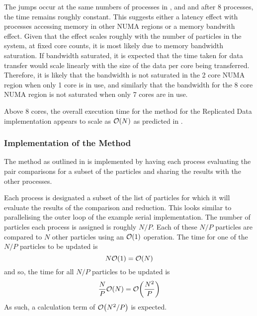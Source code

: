 The jumps occur at the same numbers of processes in
,
 and
and after 8 processes, the time remains roughly constant.
%
This suggests either a latency effect with processes accessing memory
in other NUMA regions or a memory bandwith effect.
%
Given that the effect scales roughly with the number of particles
in the system, at fixed core counts, it is most likely due to
memory bandwidth saturation.
%
If bandwidth saturated, it is expected that the time taken for
data transfer would
scale linearly with the size of the data per core being transferred.
%
Therefore, it is likely that the bandwidth is not saturated in the 2 core NUMA
region when only 1 core is in use, and
similarly that the bandwidth for the 8 core NUMA region is not saturated
when only 7 cores are in use.

Above 8 cores, the overall execution time for
the \individualoperation{} method for the Replicated Data implementation
appears to scale as $\mathcal{O}{\left({ N }\right)}$
as predicted in .


%
%

\subsubsection{Implementation of the \pairoperation{} Method}

The \pairoperation{} method as outlined in
is implemented by having each process evaluating the pair
comparisons for a subset of the particles and sharing the
results with the other processes.

Each process is designated a subset of the list of particles for which
it will evaluate the results of the comparison and reduction.
%
This looks similar to parallelising the outer loop of the example
serial implementation.
%
The number of particles each process is assigned is roughly $N/P$.
%
Each of these $N/P$ particles are compared to $N$ other particles
using an $\mathcal{O}{\left({ 1 }\right)}$ operation.
%
The time for one of the $N/P$ particles to be updated is
\begin{equation}
    N\mathcal{O}{\left({ 1 }\right)} = \mathcal{O}{\left({ N }\right)}
\end  {equation}
and so, the time for all $N/P$ particles to be updated is
\begin{equation}
    \frac{N}{P}\mathcal{O}{\left({ N }\right)} = \mathcal{O}{\left({ \frac{N^2}{P} }\right)}
\end  {equation}
As such, a calculation term of $\mathcal{O}{\left({ N^2/P }\right)}$ is expected.

